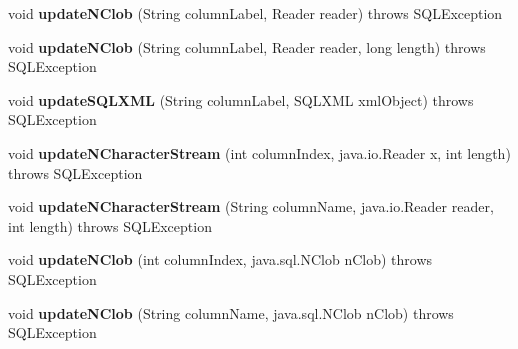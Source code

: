 \begin{DoxyCompactItemize}
void {\bfseries update\+N\+Clob} (String column\+Label, Reader reader)  throws S\+Q\+L\+Exception 
\item 
\mbox{\label{classcom_1_1mysql_1_1cj_1_1jdbc_1_1result_1_1_updatable_result_set_a33690e16498428c09988470ac90760b3}} 
void {\bfseries update\+N\+Clob} (String column\+Label, Reader reader, long length)  throws S\+Q\+L\+Exception 
\item 
\mbox{\label{classcom_1_1mysql_1_1cj_1_1jdbc_1_1result_1_1_updatable_result_set_a910911d149fe953b542aa572ec84e049}} 
void {\bfseries update\+S\+Q\+L\+X\+ML} (String column\+Label, S\+Q\+L\+X\+ML xml\+Object)  throws S\+Q\+L\+Exception 
\item 
\mbox{\label{classcom_1_1mysql_1_1cj_1_1jdbc_1_1result_1_1_updatable_result_set_a3fd97766c7077e7ca286aaf2054794ad}} 
void {\bfseries update\+N\+Character\+Stream} (int column\+Index, java.\+io.\+Reader x, int length)  throws S\+Q\+L\+Exception 
\item 
\mbox{\label{classcom_1_1mysql_1_1cj_1_1jdbc_1_1result_1_1_updatable_result_set_aecac222109cc865ddbf1f66b415468c0}} 
void {\bfseries update\+N\+Character\+Stream} (String column\+Name, java.\+io.\+Reader reader, int length)  throws S\+Q\+L\+Exception 
\item 
\mbox{\label{classcom_1_1mysql_1_1cj_1_1jdbc_1_1result_1_1_updatable_result_set_a4b04033adf60739cfaabef5b5927c513}} 
void {\bfseries update\+N\+Clob} (int column\+Index, java.\+sql.\+N\+Clob n\+Clob)  throws S\+Q\+L\+Exception 
\item 
\mbox{\label{classcom_1_1mysql_1_1cj_1_1jdbc_1_1result_1_1_updatable_result_set_acd8e3844582f1e16c707450c433830cd}} 
void {\bfseries update\+N\+Clob} (String column\+Name, java.\+sql.\+N\+Clob n\+Clob)  throws S\+Q\+L\+Exception 
\item 
\mbox{\label{classcom_1_1mysql_1_1cj_1_1jdbc_1_1result_1_1_updatable_result_set_a0fecffadc1c57ffbfbdcb503f9805945}} 

\end{DoxyCompactItemize}
